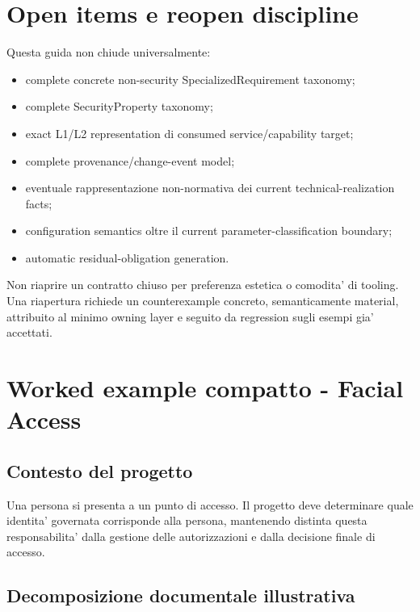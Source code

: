 \documentclass[11pt,a4paper]{article}
\begin{document}
\section{Open items e reopen discipline}
\opentag

Questa guida non chiude universalmente:
\begin{itemize}
  \item complete concrete non-security SpecializedRequirement taxonomy;
  \item complete SecurityProperty taxonomy;
  \item exact L1/L2 representation di consumed service/capability target;
  \item complete provenance/change-event model;
  \item eventuale rappresentazione non-normativa dei current technical-realization facts;
  \item configuration semantics oltre il current parameter-classification boundary;
  \item automatic residual-obligation generation.
\end{itemize}

\begin{ddtacore}[title={Reopen rule}]
Non riaprire un contratto chiuso per preferenza estetica o comodita' di tooling. Una riapertura richiede un counterexample concreto, semanticamente material, attribuito al minimo owning layer e seguito da regression sugli esempi gia' accettati.
\end{ddtacore}

\appendix
\section{Worked example compatto - Facial Access}

\subsection{Contesto del progetto}

Una persona si presenta a un punto di accesso. Il progetto deve determinare quale identita' governata corrisponde alla persona, mantenendo distinta questa responsabilita' dalla gestione delle autorizzazioni e dalla decisione finale di accesso.

\subsection{Decomposizione documentale illustrativa}
\end{document}
